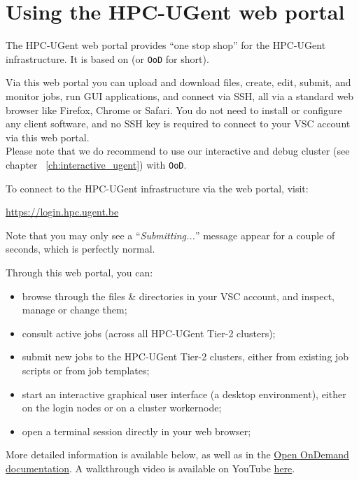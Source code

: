 \chapter{Using the HPC-UGent web portal}
\label{ch:web_portal}

The HPC-UGent web portal provides ``one stop shop'' for the HPC-UGent infrastructure.
It is based on \href{https://openondemand.org/}{} (or \texttt{OoD} for short).

Via this web portal you can upload and download files, create, edit, submit, and monitor jobs,
run GUI applications, and connect via SSH, all via a standard web browser like Firefox, Chrome
or Safari. You do not need to install or configure any client software,
and no SSH key is required to connect to your VSC account via this web portal.
 \\
Please note that we do recommend to use our interactive and debug cluster
(see chapter ~\ref{ch:interactive_ugent}) with \texttt{OoD}.

To connect to the HPC-UGent infrastructure via the web portal, visit:

\begin{center}\url{https://login.hpc.ugent.be}\end{center}

Note that you may only see a ``\emph{Submitting...}'' message appear for a couple of seconds,
which is perfectly normal.

Through this web portal, you can:
\begin{itemize}
    \item browse through the files \& directories in your VSC account, and inspect, manage or change them;
    \item consult active jobs (across all HPC-UGent Tier-2 clusters);
    \item submit new jobs to the HPC-UGent Tier-2 clusters, either from existing job scripts or from job templates;
    \item start an interactive graphical user interface (a desktop environment), either on the login nodes or on a cluster workernode;
    \item open a terminal session directly in your web browser;
\end{itemize}

More detailed information is available below, as well as in the \href{https://osc.github.io/ood-documentation/master/}{Open OnDemand documentation}.
A walkthrough video is available on YouTube \href{https://www.youtube.com/watch?v=4-w-4wjlnPk}{here}.

